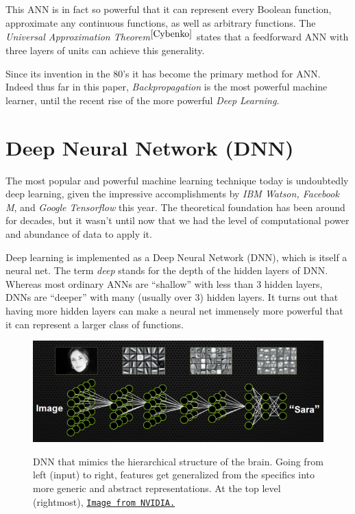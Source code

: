 \documentclass[12pt]{article}  %
\begin{document}
This ANN is in fact so powerful that it can represent every Boolean function, approximate any continuous functions, as well as arbitrary functions. The {\em Universal Approximation Theorem}$^{\ref{Cybenko}}$ states that a feedforward ANN with three layers of units can achieve this generality.

Since its invention in the 80's it has become the primary method for ANN. Indeed thus far in this paper, {\em Backpropagation} is the most powerful machine learner, until the recent rise of the more powerful {\em Deep Learning.}



\section{Deep Neural Network (DNN)}

The most popular and powerful machine learning technique today is undoubtedly deep learning, given the impressive accomplishments by \emph{IBM Watson, Facebook M}, and \emph{Google Tensorflow} this year. The theoretical foundation has been around for decades, but it wasn't until now that we had the level of computational power and abundance of data to apply it.

Deep learning is implemented as a Deep Neural Network (DNN), which is itself a neural net. The term \emph{deep} stands for the depth of the hidden layers of DNN. Whereas most ordinary ANNs are ``shallow'' with less than 3 hidden layers, DNNs are ``deeper'' with many (usually over 3) hidden layers. It turns out that having more hidden layers can make a neural net immensely more powerful that it can represent a larger class of functions.


\begin{figure}[ht]
\centering
\includegraphics[scale=0.9]{images/DNN.png}\\
\caption{DNN that mimics the hierarchical structure of the brain. Going from left (input) to right, features get generalized from the specifics into more generic and abstract representations. At the top level (rightmost),  \href{http://devblogs.nvidia.com/parallelforall/accelerate-machine-learning-cudnn-deep-neural-network-library/}{\tt Image from NVIDIA.}}\label{DNN-fig}
\end{figure}
\end{document}
